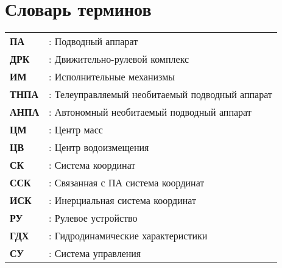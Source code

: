 \chapter*{Словарь терминов}             %

\begin{table*}[ht!]
    \begin{tabular}{ll}
		\textbf{ПА} &: Подводный аппарат \\

		\textbf{ДРК} &: Движительно-рулевой комплекс \\

		\textbf{ИМ} &: Исполнительные механизмы \\

		\textbf{ТНПА} &: Телеуправляемый необитаемый подводный аппарат \\

		\textbf{АНПА} &: Автономный необитаемый подводный аппарат \\

		\textbf{ЦМ} &: Центр масс \\

		\textbf{ЦВ} &: Центр водоизмещения \\

		\textbf{СК} &: Система координат \\

		\textbf{ССК} &: Связанная с ПА система координат \\

		\textbf{ИСК} &: Инерциальная система координат \\

		\textbf{РУ} &: Рулевое устройство \\

		\textbf{ГДХ} &: Гидродинамические характеристики \\

		\textbf{СУ} &: Система управления \\
    \end{tabular}
\end{table*}

